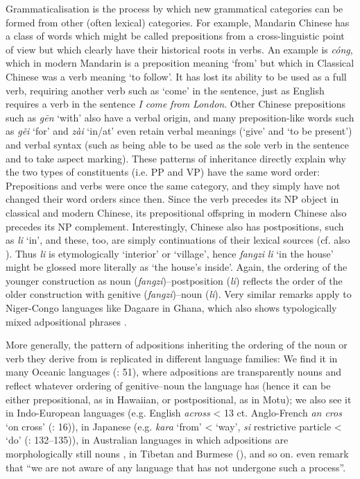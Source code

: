 \documentclass[output=paper]{langsci/langscibook}
\begin{document}
Grammaticalisation is the process by which new grammatical categories can be formed from other (often lexical) categories. For example, Mandarin Chinese has a class of words which might be called prepositions from a cross-linguistic point of view but which clearly have their historical roots in verbs. An example is  \textit{cóng}, which in modern Mandarin is a preposition meaning ‘from’ but which in Classical Chinese was a verb meaning ‘to follow’. It has lost its ability to be used as a full verb, requiring another verb such as ‘come’ in the sentence, just as English requires a verb in the sentence \textit{I} \textit{come} \textit{from} \textit{London}. Other Chinese prepositions such as  \textit{gēn} ‘with’ also have a verbal origin, and many preposition-like words such as  \textit{gěi} ‘for’ and  \textit{zài} ‘in/at’ even retain verbal meanings (‘give’ and ‘to be present’) and verbal syntax (such as being able to be used as the sole verb in the sentence and to take aspect marking). These patterns of inheritance directly explain why the two types of constituents (i.e. PP and VP) have the same word order: Prepositions and verbs were once the same category, and they simply have not changed their word orders since then. Since the verb precedes its NP object in classical and modern Chinese, its prepositional offspring in modern Chinese also precedes its NP complement. Interestingly, Chinese also has postpositions, such as \textit{li} ‘in’, and these, too, are simply continuations of their lexical sources (cf. also ). Thus \textit{li} is etymologically ‘interior’ or ‘village’, hence \textit{fangzi} \textit{li} ‘in the house’ might be glossed more literally as ‘the house’s inside’. Again, the ordering of the younger construction as noun (\textit{fangzi})–postposition (\textit{li}) reflects the order of the older construction with genitive (\textit{fangzi})–noun (\textit{li}). Very similar remarks apply to Niger-Congo languages like Dagaare in Ghana, which also shows typologically mixed adpositional phrases \citep{Bodomo1997}. 

More generally, the pattern of adpositions inheriting the ordering of the noun or verb they derive from is replicated in different language families: We find it in many Oceanic languages (\citealt{LynchEtAl2002}: 51), where adpositions are transparently nouns and reflect whatever ordering of genitive–noun the language has (hence it can be either prepositional, as in Hawaiian, or postpositional, as in Motu); we also see it in Indo-European languages (e.g. English \textit{across} < 13 ct. Anglo-French \textit{an cros} ‘on cross’ (\citealt{BordetJamet2010}: 16)), in Japanese (e.g. \textit{kara} ‘from’ < ‘way’, \textit{si} restrictive particle < ‘do’ (\citealt{Frellesvig2010}: 132–135)), in Australian languages in which adpositions are morphologically still nouns \citep{Dixon2002}, in Tibetan and Burmese (\citealt{DeLancey1997}), and so on. \citet[62]{HeineKuteva2007} even remark that “we are not aware of any language that has not undergone such a process”.
\end{document}
